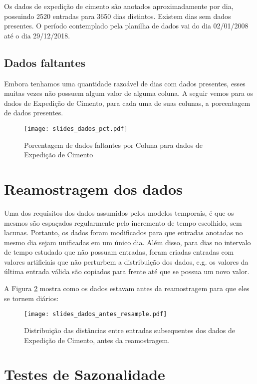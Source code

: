 Os dados de expedição de cimento são anotados aproximadamente por dia, possuindo 2520
entradas para 3650 dias distintos. Existem dias sem dados presentes. O
período contemplado pela planilha de dados vai do dia 02/01/2008 até o dia 29/12/2018.

\subsection{Dados faltantes}

Embora tenhamos uma quantidade razoável de dias com dados presentes, esses muitas vezes não possuem algum valor de alguma coluna.
A seguir vemos para os dados de Expedição de Cimento, para cada uma de suas colunas, a porcentagem de dados presentes. 


\begin{figure}[H]
  \centering
  \texttt{[image: slides\_dados\_pct.pdf]}
  \caption{Porcentagem de dados faltantes por Coluna para dados de Expedição de Cimento}
  \label{fig:dadosfalta}
\end{figure}


\section{Reamostragem dos dados}

Uma dos requisitos dos dados assumidos pelos modelos temporais, é que os mesmos
são espaçados regularmente pelo incremento de tempo escolhido, sem lacunas.
Portanto, os dados foram modificados para que entradas anotadas no mesmo dia
sejam unificadas em um único dia. Além disso, para dias no intervalo de tempo
estudado que não possuam entradas, foram criadas entradas com valores
artificiais que não perturbem a distribuição dos dados, e.g. os valores da
última entrada válida são copiados para frente até que se possua um novo valor.

A Figura \ref{fig:reamos} mostra como os dados estavam antes da reamostragem
para que eles se tornem diários: 

\begin{figure}[H]
  \centering
  \texttt{[image: slides\_dados\_antes\_resample.pdf]}
  \caption{Distribuição das distâncias entre entradas subsequentes dos dados de Expedição de Cimento, antes da reamostragem.}
  \label{fig:reamos}
\end{figure}



\section{Testes de Sazonalidade}

